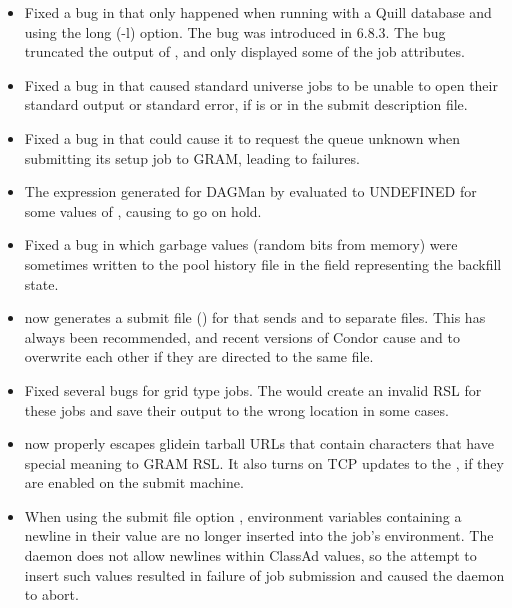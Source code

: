 \begin{itemize}

\item Fixed a bug in  that only happened when running 
with a Quill database and using the long (-l) option.  The bug was 
introduced in 6.8.3.  The bug truncated the output of , and
only displayed some of the job attributes.

\item Fixed a bug in  that caused standard universe jobs
to be unable to open their standard output or standard error, if
 is  or 
 in the submit description file.

\item Fixed a bug in  that could cause it to request the
queue unknown when submitting its setup job to GRAM, leading to
failures.

\item The  expression generated for DAGMan by
 evaluated to UNDEFINED for some values of
, causing  to go on hold.

\item Fixed a bug in which garbage values (random bits from memory)
were sometimes
written to the pool history file in the field representing the
backfill state.

\item {} now generates a submit file
() for  that sends  and
 to separate files.  This has always been recommended,
and recent versions of Condor cause  and  to
overwrite each other if they are directed to the same file.

\item Fixed several bugs for grid type  jobs.
The  would create an invalid RSL for these jobs
and save their output to the wrong location in some cases.

\item {} now properly escapes glidein tarball URLs that
contain characters that have special meaning to GRAM RSL. It also turns
on TCP updates to the ,
if they are enabled on the submit machine.

\item When using the submit file option ,
environment
variables containing a newline in their value are no longer inserted
into the job's environment.  The  daemon
does not allow newlines
within ClassAd values, so the attempt to insert such values resulted
in failure of job submission and caused the  daemon
to abort.


\end{itemize}
